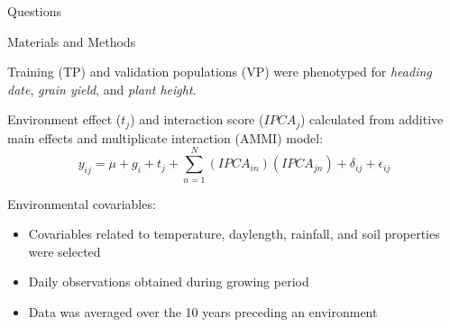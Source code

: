 \documentclass[final]{beamer}
\newlength{\onecolwid}
\begin{document}
\begin{frame}[t]
\begin{columns}[t]
\begin{column}{\onecolwid}
\begin{alertblock}{\large{Questions}}
\begin{footnotesize}
\end{footnotesize}


\end{alertblock}



\begin{block}{Materials and Methods}

Training (TP) and validation populations (VP) were phenotyped for \textit{heading date}, \textit{grain yield}, and \textit{plant height}.




\vspace{1cm}

Environment effect ($t_j$) and interaction score ($IPCA_j$) calculated from additive main effects and multiplicate interaction (AMMI) model: 
  $$y_{ij} = \mu + g_i + t_j + \sum^N_{n=1} (IPCA_{in})(IPCA_{jn}) + \delta_{ij} + \epsilon_{ij}$$


\vspace{1cm}


Environmental covariables:

\begin{footnotesize}

\begin{itemize}
  \item Covariables related to temperature, daylength, rainfall, and soil properties were selected 
  \item Daily observations obtained during growing period
  \item Data was averaged over the 10 years preceding an environment
\end{itemize}


\end{footnotesize}
\end{block}
\end{column}
\end{columns}
\end{frame}
\end{document}
